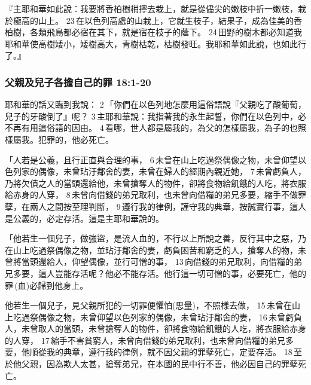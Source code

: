 『主耶和華如此說：我要將香柏樹梢擰去栽上，就是從儘尖的嫩枝中折一嫩枝，栽於極高的山上。 23 在以色列高處的山栽上，它就生枝子，結果子，成為佳美的香柏樹，各類飛鳥都必宿在其下，就是宿在枝子的蔭下。 24 田野的樹木都必知道我耶和華使高樹矮小，矮樹高大，青樹枯乾，枯樹發旺。我耶和華如此說，也如此行了。』

\subsubsection{父親及兒子各擔自己的罪 18:1-20}
耶和華的話又臨到我說： 2 「你們在以色列地怎麼用這俗語說『父親吃了酸葡萄，兒子的牙酸倒了』呢？ 3 主耶和華說：我指著我的永生起誓，你們在以色列中，必不再有用這俗語的因由。 4 看哪，世人都是屬我的，為父的怎樣屬我，為子的也照樣屬我。犯罪的，他必死亡。

「人若是公義，且行正直與合理的事， 6 未曾在山上吃過祭偶像之物，未曾仰望以色列家的偶像，未曾玷汙鄰舍的妻，未曾在婦人的經期內親近她， 7 未曾虧負人，乃將欠債之人的當頭還給他，未曾搶奪人的物件，卻將食物給飢餓的人吃，將衣服給赤身的人穿， 8 未曾向借錢的弟兄取利，也未曾向借糧的弟兄多要，縮手不做罪孽，在兩人之間按至理判斷， 9 遵行我的律例，謹守我的典章，按誠實行事，這人是公義的，必定存活。這是主耶和華說的。

「他若生一個兒子，做強盜，是流人血的，不行以上所說之善，反行其中之惡，乃在山上吃過祭偶像之物，並玷汙鄰舍的妻，虧負困苦和窮乏的人，搶奪人的物，未曾將當頭還給人，仰望偶像，並行可憎的事， 13 向借錢的弟兄取利，向借糧的弟兄多要，這人豈能存活呢？他必不能存活。他行這一切可憎的事，必要死亡，他的罪 (血)必歸到他身上。

他若生一個兒子，見父親所犯的一切罪便懼怕(思量)，不照樣去做， 15 未曾在山上吃過祭偶像之物，未曾仰望以色列家的偶像，未曾玷汙鄰舍的妻， 16 未曾虧負人，未曾取人的當頭，未曾搶奪人的物件，卻將食物給飢餓的人吃，將衣服給赤身的人穿， 17 縮手不害貧窮人，未曾向借錢的弟兄取利，也未曾向借糧的弟兄多要，他順從我的典章，遵行我的律例，就不因父親的罪孽死亡，定要存活。 18 至於他父親，因為欺人太甚，搶奪弟兄，在本國的民中行不善，他必因自己的罪孽死亡。

